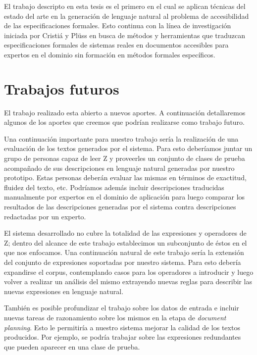 El trabajo descripto en esta tesis es el primero en el cual se aplican técnicas del estado del arte en la generación de lenguaje natural al problema de accesibilidad de las especificaciones formales. Esto continua con la línea de investigación iniciada por Cristiá y Plüss \cite{cristia_pluss} en busca de métodos y herramientas que traduzcan especificaciones formales de sistemas reales en documentos accesibles para expertos en el dominio sin formación en métodos formales específicos. 

\section*{Trabajos futuros}

El trabajo realizado esta abierto a nuevos aportes. A continuación detallaremos algunos de los aportes que creemos que podrían realizarse como trabajo futuro.

Una continuación importante para nuestro trabajo sería la realización de una evaluación de los textos generados por el sistema. Para esto deberíamos juntar un grupo de personas capaz de leer Z y proveerles un conjunto de clases de prueba acompañado de sus descripciones en lenguaje natural generadas por nuestro prototipo. Estas personas deberán evaluar las mismas en términos de exactitud, fluidez del texto, etc. Podríamos además incluir descripciones traducidas manualmente por expertos en el dominio de aplicación para luego comparar los resultados de las descripciones generadas por el sistema contra descripciones redactadas por un experto.

El sistema desarrollado no cubre la totalidad de las expresiones y operadores de Z; dentro del alcance de este trabajo establecimos un subconjunto de éstos en el que nos enfocamos. Una continuación natural de este trabajo sería la extensión del conjunto de expresiones soportadas por nuestro sistema. Para esto debería expandirse el corpus, contemplando casos para los operadores a introducir y luego volver a realizar un análisis del mismo extrayendo nuevas reglas para describir las nuevas expresiones en lenguaje natural. 

También es posible profundizar el trabajo sobre los datos de entrada e incluir nuevas tareas de razonamiento sobre los mismos en la etapa de \textit{document planning}. Esto le permitiría a nuestro sistema mejorar la calidad de los textos producidos. Por ejemplo, se podría trabajar sobre las expresiones redundantes que pueden aparecer en una clase de prueba.

